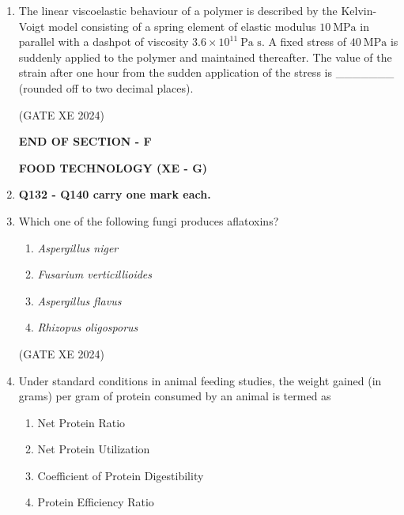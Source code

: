 \documentclass[12pt]{article}
\begin{document}
\begin{enumerate}
The ratio of the viscosity-average molecular weight $(M_v)$ of polymer sample 1 to that of polymer sample 2, i.e., $(M_v)_1/(M_v)_2$, is \_\_\_\_\_\_\_ (rounded off to two decimal places). 

(GATE XE 2024)

\item The linear viscoelastic behaviour of a polymer is described by the Kelvin-Voigt model consisting of a spring element of elastic modulus $10\ \text{MPa}$ in parallel with a dashpot of viscosity $3.6\times 10^{11}\ \text{Pa s}$. A fixed stress of $40\ \text{MPa}$ is suddenly applied to the polymer and maintained thereafter. The value of the strain after one hour from the sudden application of the stress is \_\_\_\_\_\_\_ (rounded off to two decimal places). 

(GATE XE 2024)

\begin{center}
    \textbf{END OF SECTION - F}
\end{center}

\newpage

\begin{center}
    {\Large \textbf{FOOD TECHNOLOGY (XE - G)}}
\end{center}

\item[] \textbf{Q132 - Q140 carry one mark each.}
\item Which one of the following fungi produces aflatoxins?

\begin{enumerate}
\item \textit{Aspergillus niger}
\item \textit{Fusarium verticillioides}
\item \textit{Aspergillus flavus}
\item \textit{Rhizopus oligosporus}
\end{enumerate}

(GATE XE 2024)

\item Under standard conditions in animal feeding studies, the weight gained (in grams) per gram of protein consumed by an animal is termed as

\begin{enumerate}
\item Net Protein Ratio
\item Net Protein Utilization
\item Coefficient of Protein Digestibility
\item Protein Efficiency Ratio
\end{enumerate}


\end{enumerate}
\end{document}
